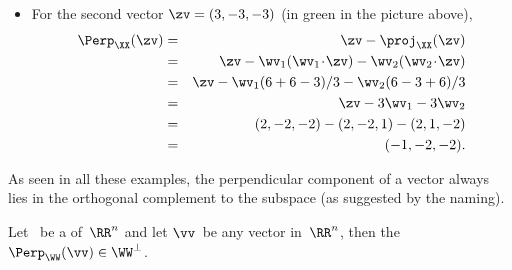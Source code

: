 \begin{example}
\begin{enumerate}
\begin{solution}
\begin{itemize}
\item For the second vector \(\zv=(3,-3,-3)\) (in green in the picture above),
\begin{eqnarray*}
\Perp_\XX(\zv)
&=&\zv-\proj_\XX(\zv)
\\&=&\zv-\wv_1(\wv_1\cdot\zv)-\wv_2(\wv_2\cdot\zv)
\\&=&\zv-\wv_1(6+6-3)/3-\wv_2(6-3+6)/3
\\&=&\zv-3\wv_1-3\wv_2
\\&=&(2,-2,-2)-(2,-2,1)-(2,1,-2)
\\&=&(-1,-2,-2).
\end{eqnarray*}
\end{itemize}
\end{solution}

\end{enumerate}
\end{example}


As seen in all these examples, the perpendicular component of a vector always lies in the orthogonal complement to the subspace  (as suggested by the naming).


\begin{theorem} \label{thm:perpn}
Let \WW\ be a  of~\(\RR^n\) and let \(\vv\)~be any vector in~\(\RR^n\), then the  \(\Perp_\WW(\vv)\in\WW^\perp\).
\end{theorem}

